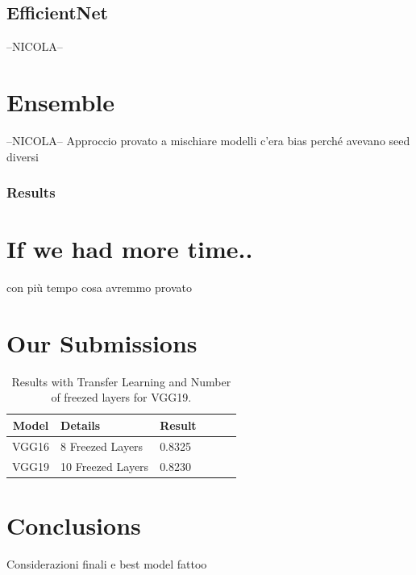 \documentclass[10pt]{article}
\begin{document}
\subsection{EfficientNet}
--NICOLA--



\section{Ensemble}
--NICOLA--
Approccio
provato a mischiare modelli
          c'era bias perché avevano seed diversi
\subsubsection{Results}



\section{If we had more time..}
con più tempo cosa avremmo provato




\section{Our Submissions}
\begin{table}[ht]
\centering
\begin{adjustbox}{width=240}
\small
\begin{tabular}{|c|l|l|l|l|l}

\hline \bf Model & \bf Details & \bf Result \\ \hline
VGG16 & 8 Freezed Layers & 0.8325 \\
VGG19 & 10 Freezed Layers & 0.8230 \\
\hline
\end{tabular}
\end{adjustbox}
\caption{Results with Transfer Learning and Number of freezed layers for VGG19.}
\end{table}
\section{Conclusions}
Considerazioni finali e best model fattoo

\end{document}
